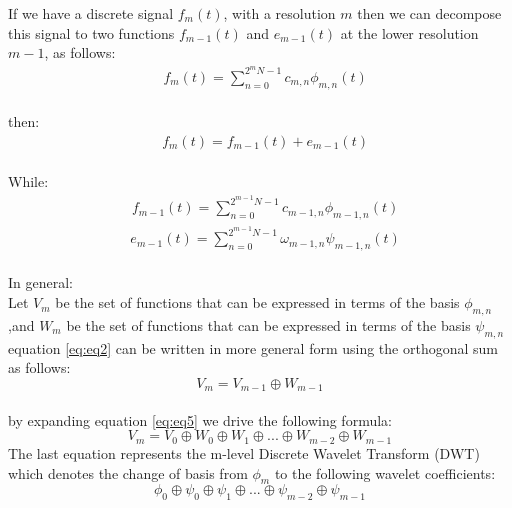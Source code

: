 \documentclass{svproc}
\begin{document}
If we have a discrete signal $f_m(t)$, with a resolution $m$
then we can decompose this signal to two functions $f_{m-1}(t)$
and $e_{m-1}(t)$ at the lower resolution $m-1$, as follows:\\

\begin{equation}
  \begin{aligned}
     & f_m(t)=\sum_{n=0}^{2^m N-1} c_{m, n} \phi_{m, n}(t)
  \end{aligned}
  \label{eq:eq1}
\end{equation}\\
then:
\begin{equation}
  \begin{aligned}
     & f_m(t)=f_{m-1}(t)+ e_{m-1}(t)
  \end{aligned}
  \label{eq:eq2}
\end{equation}\\

While:
\begin{equation}
    \begin{aligned}
       & f_{m-1}(t)=\sum_{n=0}^{2^{m-1} N-1} c_{{m-1}, n} \phi_{{m-1}, n}(t)
    \end{aligned}
    \label{eq:eq3}
  \end{equation}
  \begin{equation}
    \begin{aligned}
       & e_{m-1}(t)=\sum_{n=0}^{2^{m-1} N-1} \omega_{{m-1}, n} \psi_{{m-1}, n}(t)
    \end{aligned}
    \label{eq:eq4}
  \end{equation}\\
In general:\\ 
Let $V_m$ be the set of functions that can be expressed in terms of the basis $\phi_{m,n}$\\
,and $W_m$ be the set of functions that can be expressed in terms of the basis $\psi_{m,n}$\\

\noindent
equation \ref{eq:eq2} can be written in more general form using the orthogonal sum as follows:\\
\begin{equation}
  V_m=V_{m-1} \oplus W_{m-1}
  \label{eq:eq5}
\end{equation}\\
\noindent
by expanding equation \ref{eq:eq5} we drive the following formula:
\begin{equation}
  V_m=V_0\oplus W_0\oplus W_1\oplus ... \oplus W_{m-2}\oplus W_{m-1}
  \label{eq:eq6}
\end{equation}
\noindent
The last equation represents the m-level Discrete Wavelet Transform (DWT)
which denotes the change of basis from $\phi_m$ to the following wavelet coefficients:
\begin{equation}
  \phi_0\oplus \psi_0\oplus \psi_1\oplus ... \oplus \psi_{m-2}\oplus \psi_{m-1}
  \label{eq:eq7}
\end{equation}
\end{document}
